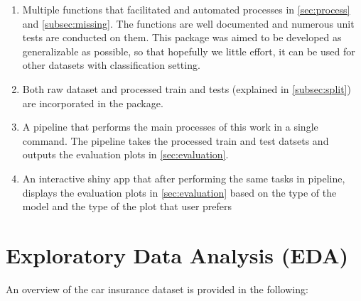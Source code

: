 \documentclass{article}
\begin{document}
\begin{enumerate}
\def\labelenumi{\arabic{enumi}.}
\item
  Multiple functions that facilitated and automated processes in
  \ref{sec:process} and \ref{subsec:missing}. The functions are well
  documented and numerous unit tests are conducted on them. This package
  was aimed to be developed as generalizable as possible, so that
  hopefully we little effort, it can be used for other datasets with
  classification setting.
\item
  Both raw dataset and processed train and tests (explained in
  \ref{subsec:split}) are incorporated in the package.
\item
  A pipeline that performs the main processes of this work in a single
  command. The pipeline takes the processed train and test datsets and
  outputs the evaluation plots in \ref{sec:evaluation}.
\item
  An interactive shiny app that after performing the same tasks in
  pipeline, displays the evaluation plots in \ref{sec:evaluation} based
  on the type of the model and the type of the plot that user prefers
\end{enumerate}

\hypertarget{exploratory-data-analysis-eda}{%
\section{\texorpdfstring{Exploratory Data Analysis (EDA)
\label{sec:data}}{Exploratory Data Analysis (EDA) }}\label{exploratory-data-analysis-eda}}

An overview of the car insurance dataset is provided in the following:
\tiny
\end{document}
